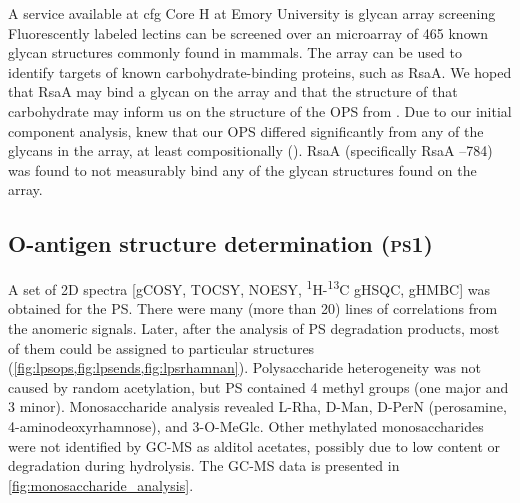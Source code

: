   A service available at \ac{cfg} Core H at Emory University is glycan array screening Fluorescently labeled lectins can be screened over an microarray of 465 known glycan structures commonly found in mammals. The array can be used to identify targets of known carbohydrate-binding proteins, such as RsaA. We hoped that RsaA may bind a glycan on the array and that the structure of that carbohydrate may inform us on the structure of the \ac{OPS} from \caulobacter. Due to our initial component analysis, knew that our \ac{OPS} differed significantly from any of the glycans in the array, at least compositionally (). RsaA (specifically RsaA --784) was found to not measurably bind any of the glycan structures found on the array. 

	\subsection{O-antigen structure determination (\textsc{ps}1)} %
	\label{sub:o_antigen_structure_determination_ps1_}

  A set of 2D spectra [\ac{gCOSY}, \ac{TOCSY}, \ac{NOESY},
  \textsuperscript{1}H-\textsuperscript{13}C \ac{gHSQC}, \ac{gHMBC}] was obtained for the
  \ac{PS}. There were many (more than 20) lines of correlations from the anomeric signals. Later,
  after the analysis of \ac{PS} degradation products, most of them could be assigned to particular
  structures (\cref{fig:lpsops,fig:lpsends,fig:lpsrhamnan}). Polysaccharide heterogeneity was not
  caused by random acetylation, but \ac{PS} contained 4 methyl groups (one major and 3
  minor). Monosaccharide analysis revealed L-Rha, D-Man, D-PerN (perosamine, 4-aminodeoxyrhamnose),
  and 3-O-MeGlc. Other methylated monosaccharides were not identified by \ac{GC-MS} as alditol
  acetates, possibly due to low content or degradation during hydrolysis. The \ac{GC-MS} data is
  presented in \cref{fig:monosaccharide_analysis}.

